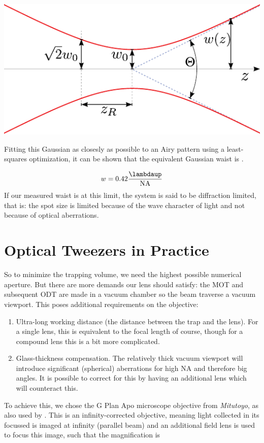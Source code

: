 \begin{mdframed}
    \vspace*{3mm}
    \centering
        \includegraphics[width=0.5\linewidth]{figures/GaussianBeam.pdf}
        \label{fig:GaussianBeam}
\end{mdframed}

Fitting this Gaussian as closesly as possible to an Airy pattern using a least-squares optimization, it can be shown that the equivalent Gaussian waist is \cite{Zhang2007}.

\begin{equation}\label{eq:GaussianAiryFit}
    w = 0.42 \frac{\lambdaup}{\text{NA}}
\end{equation}
If our measured waist is at this limit, the system is said to be diffraction limited, that is: the spot size is limited because of the wave character of light and not because of optical aberrations. 

\section{Optical Tweezers in Practice}\label{sec:TweezersPractice}

So to minimize the trapping volume, we need the highest possible numerical aperture. But there are more demands our lens should satisfy: the \ac{MOT} and subsequent \ac{ODT} are made in a vacuum chamber so the beam traverse a vacuum viewport. This poses additional requirements on the objective:

\begin{enumerate}
    \item Ultra-long working distance (the distance between the trap and the lens). For a single lens, this is equivalent to the focal length of course, though for a compound lens this is a bit more complicated. 
    
    \item Glass-thickness compensation. The relatively thick vacuum viewport will introduce significant (spherical) aberrations for high NA and therefore big angles. It is possible to correct for this by having an additional lens which will counteract this.
\end{enumerate}
To achieve this, we chose the G Plan Apo microscope objective from \textit{Mitutoyo}, as also used by \cite{Manuel2016,Ebadi2021}. 
This is an infinity-corrected objective, meaning light collected in its focussed is imaged at infinity (parallel beam) and an additional field lens is used to focus this image, such that the magnification is 

